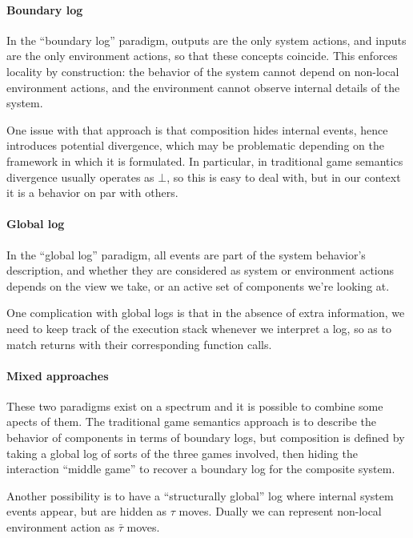 \documentclass[11pt]{article}
\begin{document}
\paragraph{Boundary log}

In the ``boundary log'' paradigm,
outputs are the only system actions, and
inputs are the only environment actions,
so that these concepts coincide.
This enforces locality by construction:
the behavior of the system
cannot depend on non-local environment actions,
and the environment
cannot observe internal details of the system.

One issue with that approach is that
composition hides internal events,
hence introduces potential divergence,
which may be problematic depending on the
framework in which it is formulated.
In particular,
in traditional game semantics
divergence usually operates as $\bot$,
so this is easy to deal with,
but in our context it is a behavior on par with others.

\paragraph{Global log}

In the ``global log'' paradigm,
all events are part of the system behavior's description,
and whether they are considered as system or environment actions
depends on the view we take,
or an active set of components we're looking at.

One complication with global logs is that
in the absence of extra information,
we need to keep track of the execution stack whenever
we interpret a log,
so as to match returns with their corresponding function calls.


\paragraph{Mixed approaches}

These two paradigms exist on a spectrum and
it is possible to combine some apects of them.
The traditional game semantics approach
is to describe the behavior of components in terms of boundary logs,
but composition is defined by taking a global log of sorts
of the three games involved,
then hiding the interaction ``middle game''
to recover a boundary log for the composite system.

Another possibility is to have a ``structurally global'' log
where internal system events appear, but are hidden as $\tau$ moves.
Dually we can represent
non-local environment action as $\bar{\tau}$ moves.
\end{document}
